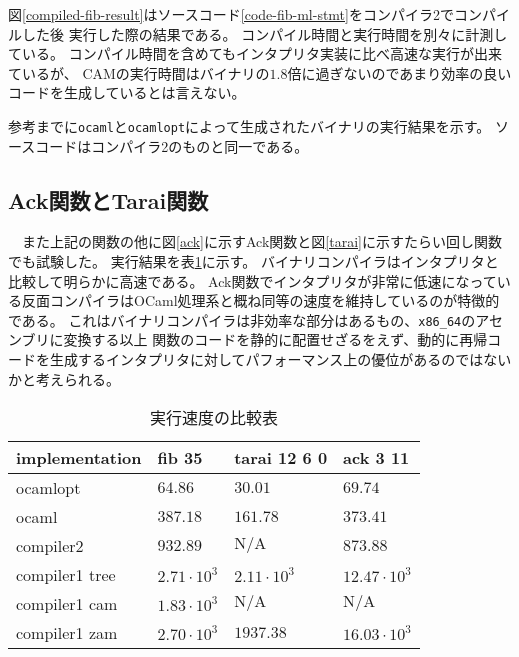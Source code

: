 \documentclass[report]{jlreq}
\begin{document}
      図\ref{compiled-fib-result}はソースコード\ref{code-fib-ml-stmt}をコンパイラ2でコンパイルした後
      実行した際の結果である。
      コンパイル時間と実行時間を別々に計測している。
      コンパイル時間を含めてもインタプリタ実装に比べ高速な実行が出来ているが、
      CAMの実行時間はバイナリの$1.8$倍に過ぎないのであまり効率の良いコードを生成しているとは言えない。
      
      

      参考までに\texttt{ocaml}と\texttt{ocamlopt}によって生成されたバイナリの実行結果を示す。
      ソースコードはコンパイラ2のものと同一である。
      
    \subsection{Ack関数とTarai関数}
    　また上記の関数の他に図\ref{ack}に示すAck関数と図\ref{tarai}に示すたらい回し関数でも試験した。
      実行結果を表\ref{compare-tbl}に示す。
      バイナリコンパイラはインタプリタと比較して明らかに高速である。
      Ack関数でインタプリタが非常に低速になっている反面コンパイラはOCaml処理系と概ね同等の速度を維持しているのが特徴的である。
      これはバイナリコンパイラは非効率な部分はあるもの、\texttt{x86\_64}のアセンブリに変換する以上
      関数のコードを静的に配置せざるをえず、動的に再帰コードを生成するインタプリタに対してパフォーマンス上の優位があるのではないかと考えられる。
      
      
      \begin{table}[t]
        \centering
        \label{compare-tbl}
        \caption{実行速度の比較表}
        \begin{tabular}{l|lll}
        implementation & fib 35             & tarai 12 6 0         & ack 3 11            \\ \hline
        ocamlopt       & $64.86           $ & $ 30.01            $ & $ 69.74            $ \\
        ocaml          & $387.18          $ & $ 161.78           $ & $ 373.41           $ \\
        compiler2      & $932.89          $ & $ \mathrm{N/A}     $ & $ 873.88           $ \\
        compiler1 tree & $2.71 \cdot 10^3 $ & $ 2.11 \cdot 10^3  $ & $ 12.47 \cdot 10^3 $ \\
        compiler1 cam  & $1.83 \cdot 10^3 $ & $ \mathrm{N/A}     $ & $ \mathrm{N/A}     $ \\
        compiler1 zam  & $2.70 \cdot 10^3 $ & $ 1937.38          $ & $ 16.03 \cdot 10^3 $
        \end{tabular}
      \end{table}
\end{document}
